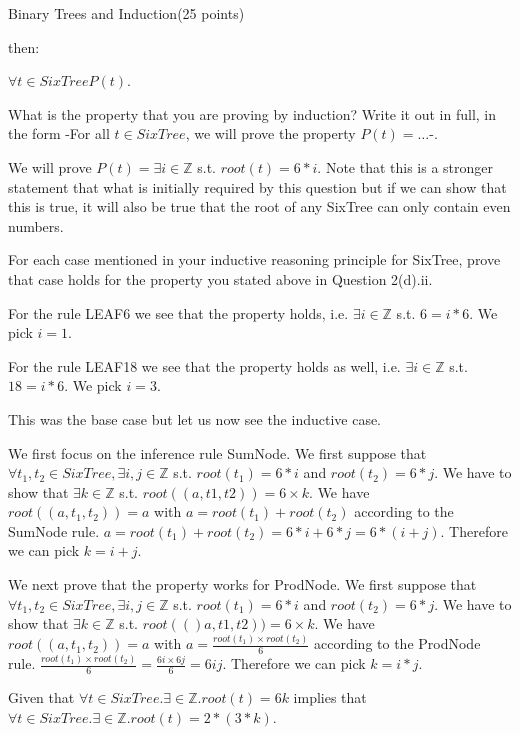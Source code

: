 \documentclass{article}
\begin{document}
\begin{question}{Binary Trees and Induction}{(25 points)}
\begin{subquestion}
\begin{subsubquestion}
	then:
	
	$\forall t \in SixTree P(t)$.

    \end{subsubquestion}
    \begin{subsubquestion}
What is the property that you are proving by induction? Write it out in full, in the form -For all
$t \in SixTree$, we will prove the property $P(t) = \dots$-.

We will prove $P(t) = \exists i \in \mathbb{Z}$ s.t. $root(t) = 6*i$. Note that this is a stronger statement that what is initially required by this question but if we can show that this is true, it will also be true that the root of any SixTree can only contain even numbers.
    
    \end{subsubquestion}
    \begin{subsubquestion}
 For each case mentioned in your inductive reasoning principle for SixTree, prove that case holds
for the property you stated above in Question 2(d).ii.
   
   For the rule LEAF6 we see that the property holds, i.e. $\exists i\in \mathbb{Z}$ s.t. $6 = i*6$. We pick $i = 1$.
   
   For the rule LEAF18 we see that the property holds as well, i.e. $\exists i\in \mathbb{Z}$ s.t. $18 = i*6$. We pick $i = 3$.
   
   This was the base case but let us now see the inductive case.
   
   We first focus on the inference rule SumNode. We first suppose that $\forall t_1, t_2 \in SixTree, \exists i,j \in \mathbb{Z}$  s.t. $root(t_1)=6*i$ and  $root(t_2)=6*j$. We have to show that $\exists k\in \mathbb{Z}$ s.t. $root((a, t1, t2)) = 6 \times k$. We have $root((a, t_1, t_2)) = a$ with $a = root(t_1) + root(t_2)$ according to the SumNode rule. $a = root(t_1) + root(t_2) = 6*i + 6*j = 6*(i + j)$. Therefore we can pick $k = i + j$.
   
   We next prove that the property works for ProdNode. We first suppose that $\forall t_1, t_2 \in SixTree, \exists i,j \in \mathbb{Z}$ s.t. $root(t_1)=6*i$ and  $root(t_2)=6*j$. We have to show that $\exists k \in \mathbb{Z}$ s.t. $root(()a, t1, t2)) = 6 \times k$. We have $root((a, t_1, t_2)) = a$ with $a = \frac{root(t_1) \times root(t_2)}{6}$ according to the ProdNode rule. $\frac{root(t_1) \times root(t_2)}{6} = \frac{6i \times 6j}{6} = 6ij$. Therefore we can pick $k = i*j$.
   
   
   Given that $\forall t \in SixTree. \exists \in \mathbb{Z}. root(t)=6k$ implies that $\forall t \in SixTree. \exists \in \mathbb{Z}. root(t)=2*(3*k)$. 
    \end{subsubquestion}
  \end{subquestion}

\end{question}
\end{document}
